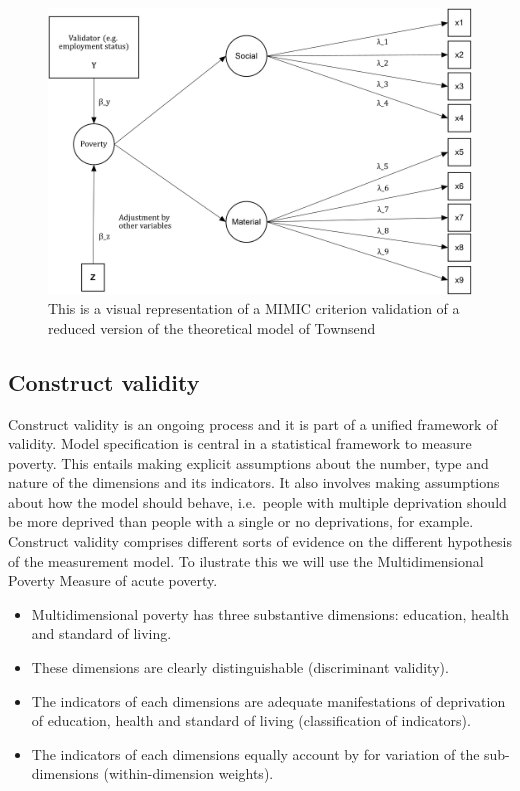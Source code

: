 \documentclass[]{book}
\providecommand{\tightlist}{%
  \setlength{\itemsep}{0pt}\setlength{\parskip}{0pt}}
\begin{document}
\begin{figure}[H]

{\centering \includegraphics[width=\textwidth]{val_md_MIMIC} 

}

\caption{This is a visual representation of a MIMIC criterion validation of a reduced version of the theoretical model of Townsend}\label{fig:valmdmimic}
\end{figure}

\hypertarget{construct-validity}{%
\subsection{Construct validity}\label{construct-validity}}

Construct validity is an ongoing process and it is part of a unified framework of validity. Model specification is central in a statistical framework to measure poverty. This entails making explicit assumptions about the number, type and nature of the dimensions and its indicators. It also involves making assumptions about how the model should behave, i.e.~people with multiple deprivation should be more deprived than people with a single or no deprivations, for example. Construct validity comprises different sorts of evidence on the different hypothesis of the measurement model. To ilustrate this we will use the Multidimensional Poverty Measure of acute poverty.

\begin{itemize}
\tightlist
\item
  Multidimensional poverty has three substantive dimensions: education, health and standard of living.
\item
  These dimensions are clearly distinguishable (discriminant validity).
\item
  The indicators of each dimensions are adequate manifestations of deprivation of education, health and standard of living (classification of indicators).
\item
  The indicators of each dimensions equally account by for variation of the sub-dimensions (within-dimension weights).
\end{itemize}
\end{document}
